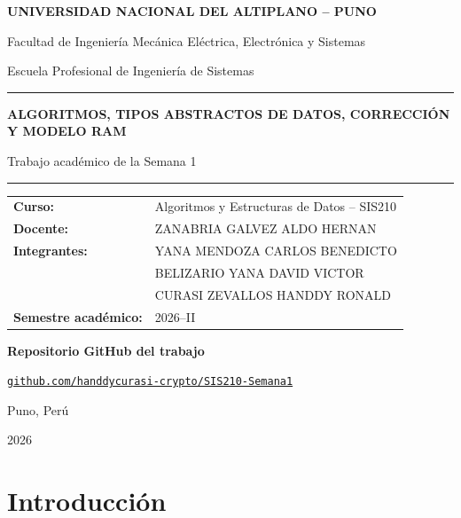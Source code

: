 \documentclass[12pt,letterpaper]{article}
\begin{document}
\hypersetup{pageanchor=false}

\begin{titlepage}
\thispagestyle{empty}
\centering
{\large\bfseries UNIVERSIDAD NACIONAL DEL ALTIPLANO -- PUNO\par}
\vspace{0.35cm}
{\normalsize Facultad de Ingeniería Mecánica Eléctrica, Electrónica y Sistemas\par}
{\normalsize Escuela Profesional de Ingeniería de Sistemas\par}
\vfill
{\color{azulUNA}\rule{0.9\textwidth}{1.2pt}\par}
\vspace{0.6cm}
{\LARGE\bfseries ALGORITMOS, TIPOS ABSTRACTOS DE DATOS, CORRECCIÓN Y MODELO RAM\par}
\vspace{0.35cm}
{\Large Trabajo académico de la Semana 1\par}
\vspace{0.6cm}
{\color{azulUNA}\rule{0.9\textwidth}{1.2pt}\par}
\vfill
\begin{tabular}{>{\bfseries}p{4.2cm}p{9.3cm}}
Curso: & Algoritmos y Estructuras de Datos -- SIS210\\[0.25cm]
Docente: & ZANABRIA GALVEZ ALDO HERNAN\\[0.25cm]
Integrantes: & YANA MENDOZA CARLOS BENEDICTO\\
& BELIZARIO YANA DAVID VICTOR\\
& CURASI ZEVALLOS HANDDY RONALD\\[0.25cm]
Semestre académico: & 2026--II
\end{tabular}
\vspace{0.7cm}
{\normalsize\bfseries Repositorio GitHub del trabajo\par}
\vspace{0.12cm}
{\small\href{https://github.com/handdycurasi-crypto/SIS210-Semana1}{\texttt{github.com/handdycurasi-crypto/SIS210-Semana1}}\par}
\vfill
{\large Puno, Perú\par}
{\large 2026\par}
\end{titlepage}

\tableofcontents
\clearpage
\hypersetup{pageanchor=true}

\section{Introducción}
\end{document}
